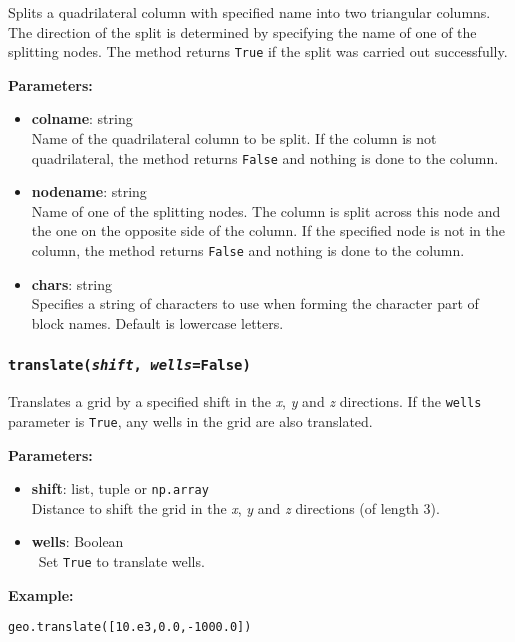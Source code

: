 Splits a quadrilateral column with specified name into two triangular columns.  The direction of the split is determined
by specifying the name of one of the splitting nodes.  The method returns \texttt{True} if the split was carried out successfully.

\textbf{Parameters:}
\begin{itemize}
\item \textbf{colname}: string\\
  Name of the quadrilateral column to be split.  If the column is not quadrilateral, the method returns \texttt{False} and nothing is done to the column.
\item \textbf{nodename}: string\\
  Name of one of the splitting nodes.  The column is split across this node and the one on the opposite side of the column.  If the specified node is not in the column, the method returns \texttt{False} and nothing is done to the column.
\item \textbf{chars}: string\\
  Specifies a string of characters to use when forming the character part of block names.  Default is lowercase letters.
\end{itemize}

\subsubsection{\texttt{translate(\emph{shift}, \emph{wells}=\texttt{False})}}
\label{sec:translate}

Translates a grid by a specified shift in the \emph{x}, \emph{y} and \emph{z} directions.  If the \texttt{wells} parameter is \texttt{True}, any wells in the grid are also translated.

\textbf{Parameters:}
\begin{itemize}
  \item \textbf{shift}: list, tuple or \texttt{np.array}\\
    Distance to shift the grid in the \emph{x}, \emph{y} and \emph{z} directions (of length 3).
  \item \textbf{wells}: Boolean\\\
    Set \texttt{True} to translate wells.
\end{itemize}

\textbf{Example:}

\begin{verbatim}
geo.translate([10.e3,0.0,-1000.0])
\end{verbatim}


